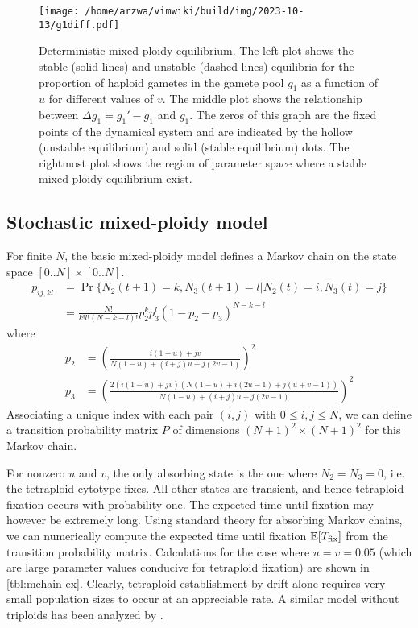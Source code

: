 \documentclass[11pt,a4paper]{article}
\begin{document}
\begin{figure}
\centering
\texttt{[image: /home/arzwa/vimwiki/build/img/2023-10-13/g1diff.pdf]}
\caption{
Deterministic mixed-ploidy equilibrium. The left plot shows the stable (solid
lines) and unstable (dashed lines) equilibria for the proportion of haploid
gametes in the gamete pool $g_1$ as a function of $u$ for different values of
$v$. The middle plot shows the relationship between $\Delta g_1 = g_1' - g_1$
and $g_1$. The zeros of this graph are the fixed points of the dynamical system
and are indicated by the hollow (unstable equilibrium) and solid (stable
equilibrium) dots. The rightmost plot shows the region of parameter space where
a stable mixed-ploidy equilibrium exist.
\label{fig:g1diff}}
\end{figure}

\subsection{Stochastic mixed-ploidy model \label{sec:mchain}}

For finite $N$, the basic mixed-ploidy model defines a Markov chain on the
state space $[0..N] \times [0..N]$.
\begin{align}
  p_{ij,kl} &= \Pr\{N_2(t+1)=k, N_3(t+1)=l | N_2(t)=i, N_3(t)=j\} \nonumber \\
    &= \frac{N!}{k!l!(N-k-l)!} p_2^k p_3^l (1-p_2-p_3)^{N-k-l}
\end{align}
where 
\begin{align}
  p_2 &= \left(\frac{i(1-u) + jv}{N(1-u) + (i+j)u + j(2v-1)}\right)^2 \\
  p_3 &= \left(\frac{2(i(1-u) + jv)(N(1-u) + i(2u - 1) + j(u + v - 1))}
    {N(1-u) + (i+j)u + j(2v-1)}\right)^2 
\end{align}
Associating a unique index with each pair $(i,j)$ with $0 \le i,j \le N$, we
can define a transition probability matrix $P$ of dimensions $(N+1)^2 \times
(N+1)^2$ for this Markov chain.

For nonzero $u$ and $v$, the only absorbing state is the one where $N_2 = N_3 =
0$, i.e. the tetraploid cytotype fixes.
All other states are transient, and hence tetraploid fixation occurs with
probability one.
The expected time until fixation may however be extremely long.
Using standard theory for absorbing Markov chains, we can numerically compute
the expected time until fixation $\mathbb{E}[T_{\text{fix}}]$ from the transition
probability matrix.
Calculations for the case where $u=v=0.05$ (which are large parameter values
conducive for tetraploid fixation) are shown in \cref{tbl:mchain-ex}.  Clearly,
tetraploid establishment by drift alone requires very small population sizes to
occur at an appreciable rate.
A similar model without triploids has been analyzed by \cite{rausch2005}.
\end{document}
